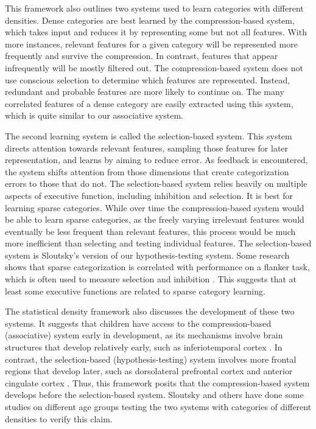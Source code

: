 \documentclass[../dissertation.tex]{subfiles}
\begin{document}
	This framework also outlines two systems used to learn categories with different densities. Dense categories are best learned by the compression-based system, which takes input and reduces it by representing some but not all features. With more instances, relevant features for a given category will be represented more frequently and survive the compression. In contrast, features that appear infrequently will be mostly filtered out. The compression-based system does not use conscious selection to determine which features are represented. Instead, redundant and probable features are more likely to continue on. The many correlated features of a dense category are easily extracted using this system, which is quite similar to our associative system. \par 
	The second learning system is called the selection-based system. This system directs attention towards relevant features, sampling those features for later representation, and learns by aiming to reduce error. As feedback is encountered, the system shifts attention from those dimensions that create categorization errors to those that do not. The selection-based system relies heavily on multiple aspects of executive function, including inhibition and selection. It is best for learning sparse categories. While over time the compression-based system would be able to learn sparse categories, as the freely varying irrelevant features would eventually be less frequent than relevant features, this process would be much more inefficient than selecting and testing individual features. The selection-based system is Sloutsky's version of our hypothesis-testing system. Some research shows that sparse categorization is correlated with performance on a flanker task, which is often used to measure selection and inhibition \citep{Perry2016}. This suggests that at least some executive functions are related to sparse category learning. \par
	The statistical density framework also discusses the development of these two systems. It suggests that children have access to the compression-based (associative) system early in development, as its mechanisms involve brain structures that develop relatively early, such as inferiotemporal cortex \citep{Rodman1994}. In contrast, the selection-based (hypothesis-testing) system involves more frontal regions that develop later, such as dorsolateral prefrontal cortex and anterior cingulate cortex \citep{Eshel2007, Lewis1997, Segalowitz2004}. Thus, this framework posits that the compression-based system develops before the selection-based system. Sloutsky and others have done some studies on different age groups testing the two systems with categories of different densities to verify this claim. \par 
\end{document}
